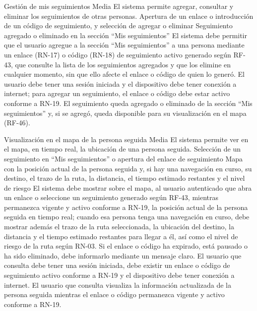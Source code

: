   {Gestión de mis seguimientos}%
  {Media}%
  {El sistema permite agregar, consultar y eliminar los seguimientos de otras personas.}%
  {Apertura de un enlace o introducción de un código de seguimiento, y selección de agregar o eliminar}%
  {Seguimiento agregado o eliminado en la sección \enquote{Mis seguimientos}}%
  {El sistema debe permitir que el usuario agregue a la sección \enquote{Mis seguimientos} a una persona mediante un enlace (RN-17) o código (RN-18) de seguimiento activo generado según RF-43, que consulte la lista de los seguimientos agregados y que los elimine en cualquier momento, sin que ello afecte el enlace o código de quien lo generó.}%
  {El usuario debe tener una sesión iniciada y el dispositivo debe tener conexión a internet; para agregar un seguimiento, el enlace o código debe estar activo conforme a RN-19.}%
  {El seguimiento queda agregado o eliminado de la sección \enquote{Mis seguimientos} y, si se agregó, queda disponible para su visualización en el mapa (RF-46).}%

  {Visualización en el mapa de la persona seguida}%
  {Media}%
  {El sistema permite ver en el mapa, en tiempo real, la ubicación de una persona seguida.}%
  {Selección de un seguimiento en \enquote{Mis seguimientos} o apertura del enlace de seguimiento}%
  {Mapa con la posición actual de la persona seguida y, si hay una navegación en curso, su destino, el trazo de la ruta, la distancia, el tiempo estimado restantes y el nivel de riesgo}%
  {El sistema debe mostrar sobre el mapa, al usuario autenticado que abra un enlace o seleccione un seguimiento generado según RF-43, mientras permanezca vigente y activo conforme a RN-19, la posición actual de la persona seguida en tiempo real; cuando esa persona tenga una navegación en curso, debe mostrar además el trazo de la ruta seleccionada, la ubicación del destino, la distancia y el tiempo estimado restantes para llegar a él, así como el nivel de riesgo de la ruta según RN-03. Si el enlace o código ha expirado, está pausado o ha sido eliminado, debe informarlo mediante un mensaje claro.}%
  {El usuario que consulta debe tener una sesión iniciada, debe existir un enlace o código de seguimiento activo conforme a RN-19 y el dispositivo debe tener conexión a internet.}%
  {El usuario que consulta visualiza la información actualizada de la persona seguida mientras el enlace o código permanezca vigente y activo conforme a RN-19.}%

